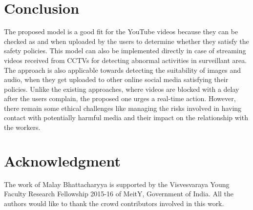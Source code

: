 \documentclass[letterpaper]{article}
\begin{document}
\section{Conclusion}
The proposed model is a good fit for the YouTube videos because they can be checked as and when uploaded by the users to determine whether they satisfy the safety policies. This model can also be implemented directly in case of streaming videos received from CCTVs for detecting abnormal activities in surveillant area. The approach is also applicable towards detecting the suitability of images and audio, when they get uploaded to other online social media satisfying their policies. Unlike the existing approaches, where videos are blocked with a delay after the users complain, the proposed one urges a real-time action. However, there remain some ethical challenges like managing the risks involved in having contact with potentially harmful media and their impact on the relationship with the workers.




\section{Acknowledgment}
The work of Malay Bhattacharyya is supported by the Visvesvaraya Young Faculty Research Fellowship 2015-16 of MeitY, Government of India. All the authors would like to thank the crowd contributors involved in this work.






\end{document}

